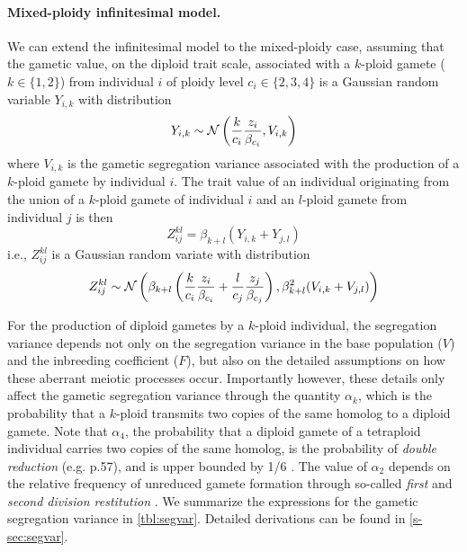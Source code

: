 \documentclass[12pt,a4paper]{article}
\begin{document}
\paragraph{Mixed-ploidy infinitesimal model.}

We can extend the infinitesimal model to the mixed-ploidy case, assuming that the
gametic value, on the diploid trait scale, associated with a $k$-ploid gamete ($k
\in \{1,2\}$) from individual $i$ of ploidy level $c_i \in \{2,3,4\}$ is a
Gaussian random variable $Y_{i,k}$ with distribution
  $$Y_{i,k} \sim \mathcal{N}\left(\frac{k}{c_i}\frac{z_i}{\beta_{c_i}}, V_{i,k}\right)$$
where $V_{i,k}$ is the gametic segregation variance associated with the
production of a $k$-ploid gamete by individual $i$.
The trait value of an individual originating from the union of a $k$-ploid
gamete of individual $i$ and an $l$-ploid gamete from individual $j$ is then
  $$Z_{ij}^{kl} = \beta_{k+l}\left(Y_{i,k} + Y_{j,l}\right)$$
i.e., $Z_{ij}^{kl}$ is a Gaussian random variate with distribution
\begin{equation}
  Z_{ij}^{kl} \sim \mathcal{N}\left(
    \beta_{k+l} \left(
          \frac{k}{c_i}\frac{z_i}{\beta_{c_i}} 
        + \frac{l}{c_j}\frac{z_j}{\beta_{c_j}}\right), 
    \beta_{k+l}^2 (V_{i,k} + V_{j,l})\right)
   \label{eq:oneline}
\end{equation}

For the production of diploid gametes by a $k$-ploid individual, the
segregation variance depends not only on the segregation variance in the base
population ($V$) and the inbreeding coefficient ($F$), but also on the detailed
assumptions on how these aberrant meiotic processes occur.
Importantly however, these details only affect the gametic segregation variance
through the quantity $\alpha_k$, which is the probability that a $k$-ploid
transmits two copies of the same homolog to a diploid gamete.
Note that $\alpha_4$, the probability that a diploid gamete of a tetraploid
individual carries two copies of the same homolog, is the probability of
\textit{double reduction} (e.g. \cite{lynch1998} p.57), and is upper bounded by
1/6 \citep{stift2008}.
The value of $\alpha_2$ depends on the relative frequency of unreduced gamete
formation through so-called \textit{first} and \textit{second division
restitution} \citep{bretagnolle1995,storme2013}.
We summarize the expressions for the gametic segregation variance in
\cref{tbl:segvar}.
Detailed derivations can be found in \cref{s-sec:segvar}.
\end{document}
